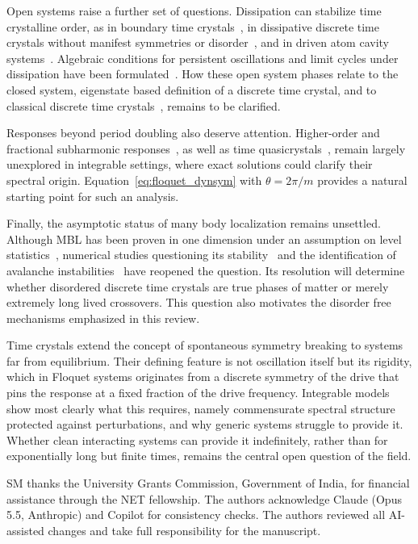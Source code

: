 \documentclass[%
reprint,
superscriptaddress,
amsmath,amssymb,
aps,
prb,
showkeys,%
floatfix,
]{revtex4-2}
\let\cite\citep   %
\begin{document}
	Open systems raise a further set of questions. Dissipation can stabilize time crystalline order, as in boundary time crystals~\cite{Iemini2018}, in dissipative discrete time crystals without manifest symmetries or disorder~\cite{Gambetta2019}, and in driven atom cavity systems~\cite{Kessler2021,Kongkhambut2022}. Algebraic conditions for persistent oscillations and limit cycles under dissipation have been formulated~\cite{Buca2019NatCommun,Buca2022SciPost}. How these open system phases relate to the closed system, eigenstate based definition of a discrete time crystal, and to classical discrete time crystals~\cite{ZaletelRMP2023}, remains to be clarified.
	
	Responses beyond period doubling also deserve attention. Higher-order and fractional subharmonic responses~\cite{Pizzi2021}, as well as time quasicrystals~\cite{Autti2018}, remain largely unexplored in integrable settings, where exact solutions could clarify their spectral origin. Equation~\eqref{eq:floquet_dynsym} with $\theta=2\pi/m$ provides a natural starting point for such an analysis.
	
	Finally, the asymptotic status of many body localization remains unsettled. Although MBL has been proven in one dimension under an assumption on level statistics~\cite{Imbrie2016}, numerical studies questioning its stability~\cite{Suntajs2020} and the identification of avalanche instabilities~\cite{DeRoeckHuveneers2017,Morningstar2022} have reopened the question. Its resolution will determine whether disordered discrete time crystals are true phases of matter or merely extremely long lived crossovers. This question also motivates the disorder free mechanisms emphasized in this review.
	
	Time crystals extend the concept of spontaneous symmetry breaking to systems far from equilibrium. Their defining feature is not oscillation itself but its rigidity, which in Floquet systems originates from a discrete symmetry of the drive that pins the response at a fixed fraction of the drive frequency. Integrable models show most clearly what this requires, namely commensurate spectral structure protected against perturbations, and why generic systems struggle to provide it. Whether clean interacting systems can provide it indefinitely, rather than for exponentially long but finite times, remains the central open question of the field.
	
	\begin{acknowledgments}
		SM thanks the University Grants Commission, Government of India, for financial assistance through the NET fellowship. The authors acknowledge Claude (Opus 5.5, Anthropic) and Copilot for consistency checks. The authors reviewed all AI-assisted changes and take full responsibility for the manuscript.
	\end{acknowledgments}
	
\end{document}
